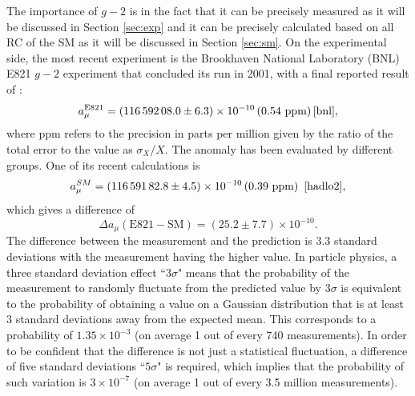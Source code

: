 \documentclass{outhesis}
\begin{document}
The importance of $g-2$ is in the fact that it can be precisely measured as it will be discussed in Section \ref{sec:exp} and it can be precisely calculated based on all RC of the SM as it will be discussed in Section \ref{sec:sm}. 
On the experimental side, the most recent experiment is the Brookhaven National Laboratory (BNL) E821 $g-2$ experiment that concluded its run in 2001, with a final reported result of \cite{bnl}:
\begin{equation}
a_{\mu}^{\text{E821}} = \left(116\, 592\, 08.0 \pm 6.3\right) \times 10^{-10} \left(0.54  \text{ ppm}\right) \cite{bnl},
\label{eq:exp}
\end{equation}
where ppm refers to the precision in parts per million given by the ratio of the total error to the value as $\sigma_X/X$. 
The anomaly has been evaluated by different groups. One of its recent calculations is
\begin{equation}
a_{\mu}^{SM} = \left(116\, 591\, 82.8 \pm 4.5\right) \times 10^{-10} \left(0.39  \text{ ppm}\right)  \,\,\cite{hadlo2},
\label{eq:sm}
\end{equation}
which gives a difference of 
\begin{equation}
\Delta a_{\mu} \left(\text{E821} - \text{SM} \right) = \left(25.2 \pm 7.7\right) \times 10^{-10}.  
\label{eq:diff}
\end{equation}
The difference between the measurement and the prediction is 3.3 standard deviations with the measurement having the higher value. In particle physics, a three standard deviation effect ``$3\sigma$" means that the probability of the measurement to randomly fluctuate from the predicted value by $3\sigma$ is equivalent to the probability of obtaining a value on a Gaussian distribution that is at least 3 standard deviations away from the expected mean. This corresponds to a probability of $1.35 \times 10^{-3}$ (on average 1 out of every 740 measurements). In order to be confident that the difference is not just a statistical fluctuation, a difference of five standard deviations ``$5\sigma$" is required, which implies that the probability of such variation is $3 \times 10^{-7}$ (on average 1 out of every 3.5 million measurements).  
\end{document}
